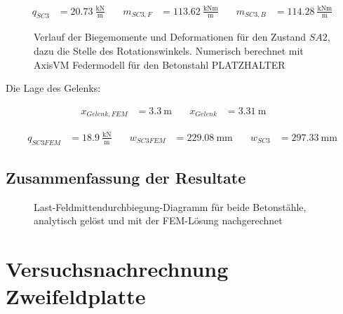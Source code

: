 \documentclass[
  11pt,
  letterpaper,
]{scrreprt}
\begin{document}
\[
\begin{aligned}
q_{SC3}& = 20.73 \ \frac{\mathrm{kN}}{\mathrm{m}} \quad & m_{SC3 , F}& = 113.62 \ \frac{\mathrm{kNm}}{\mathrm{m}} \quad & m_{SC3 , B}& = 114.28 \ \frac{\mathrm{kNm}}{\mathrm{m}} \end{aligned}
\]

\begin{figure}[H]


\caption{\label{fig-jag_feder_my_SC2}Verlauf der Biegemomente und
Deformationen für den Zustand \(SA2\), dazu die Stelle des
Rotationswinkels. Numerisch berechnet mit AxisVM Federmodell für den
Betonstahl PLATZHALTER}

\end{figure}%

Die Lage des Gelenks:

\[
\begin{aligned}
x_{Gelenk , FEM}& = 3.3 \ \mathrm{m} \quad & x_{Gelenk}& = 3.31 \ \mathrm{m} \quad &  
 \end{aligned}
\]

\[
\begin{aligned}
q_{SC3 FEM}& = 18.9 \ \frac{\mathrm{kN}}{\mathrm{m}} \quad & w_{SC3 FEM}& = 229.08 \ \mathrm{mm} \quad & w_{SC3}& = 297.33 \ \mathrm{mm} \end{aligned}
\]

\section{Zusammenfassung der
Resultate}\label{zusammenfassung-der-resultate}

\begin{figure}[H]


\caption{\label{fig-jag_q_w}Last-Feldmittendurchbiegung-Diagramm für
beide Betonstähle, analytisch gelöst und mit der FEM-Lösung
nachgerechnet}

\end{figure}%

\chapter{Versuchsnachrechnung
Zweifeldplatte}\label{versuchsnachrechnung-zweifeldplatte}
\end{document}
